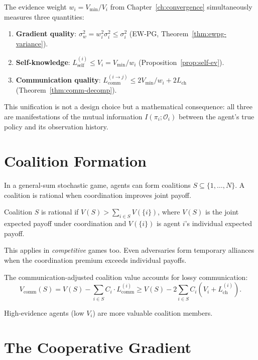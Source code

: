 The evidence weight $w_i = V_{\min}/V_i$ from Chapter~\ref{ch:convergence} simultaneously measures three quantities:

\begin{enumerate}
    \item \textbf{Gradient quality}: $\sigma_w^2 = w_i^2 \sigma_i^2 \leq \sigma_i^2$ (EW-PG, Theorem~\ref{thm:ewpg-variance}).
    \item \textbf{Self-knowledge}: $L_{\text{self}}^{(i)} \leq V_i = V_{\min}/w_i$ (Proposition~\ref{prop:self-ev}).
    \item \textbf{Communication quality}: $L_{\text{comm}}^{(i \to j)} \leq 2V_{\min}/w_i + 2L_{\text{ch}}$ (Theorem~\ref{thm:comm-decomp}).
\end{enumerate}

This unification is not a design choice but a mathematical consequence: all three are manifestations of the mutual information $I(\pi_i; \mathcal{O}_i)$ between the agent's true policy and its observation history.


\section{Coalition Formation}

In a general-sum stochastic game, agents can form coalitions $S \subseteq \{1,\ldots,N\}$. A coalition is rational when coordination improves joint payoff.

\begin{definition}
Coalition $S$ is rational if $V(S) > \sum_{i \in S} V(\{i\})$, where $V(S)$ is the joint expected payoff under coordination and $V(\{i\})$ is agent $i$'s individual expected payoff.
\end{definition}

This applies in \emph{competitive} games too. Even adversaries form temporary alliances when the coordination premium exceeds individual payoffs.

The communication-adjusted coalition value accounts for lossy communication:
\begin{equation}
    V_{\text{comm}}(S) = V(S) - \sum_{i \in S} C_i \cdot L_{\text{comm}}^{(i)}
    \geq V(S) - 2\sum_{i \in S} C_i(V_i + L_{\text{ch}}^{(i)}).
\end{equation}

High-evidence agents (low $V_i$) are more valuable coalition members.


\section{The Cooperative Gradient}

